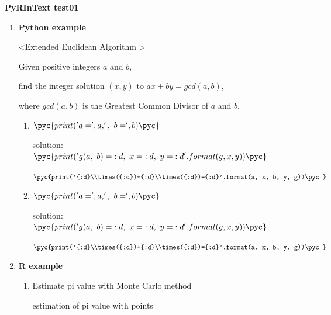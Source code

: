 \documentclass[a4paper]{article}
\begin{document}
	{\Large\bf PyRInText test01} %

	\begin{enumerate}
		\item {\bf Python example}

			\textless Extended Euclidean Algorithm \textgreater\vspace{1mm}\par
			Given positive integers $a$ and $b$,\par
			find the integer solution $(x, y)$ to $ax+by=gcd(a,b)$, \par
			where $gcd(a,b)$ is the Greatest Common Divisor of $a$ and $b$.
			\begin{enumerate}
				\item {}
					$\pyc{print('a=',a,',~b=',b)\pyc}$\par
					solution:~$\pyc{print('g(a,~b)={:d},~x={:d},~y={:d}'.format(g,x,y))\pyc}$\par
					$\pyc{print('{:d}\\times({:d})+{:d}\\times({:d})={:d}'.format(a, x, b, y, g))\pyc}$
				\item {}
					$\pyc{print('a=',a,',~b=',b)\pyc}$\par
					{
					solution:~$\pyc{print('g(a,~b)={:d},~x={:d},~y={:d}'.format(g,x,y))\pyc}$\par
					$\pyc{print('{:d}\\times({:d})+{:d}\\times({:d})={:d}'.format(a, x, b, y, g))\pyc}$}

			\end{enumerate}

		\item {\bf R example}

			\begin{enumerate}
				\item Estimate pi value with Monte Carlo method\par
					estimation of pi value with 
						 points = 
					


\end{enumerate}
\end{enumerate}
\end{document}
